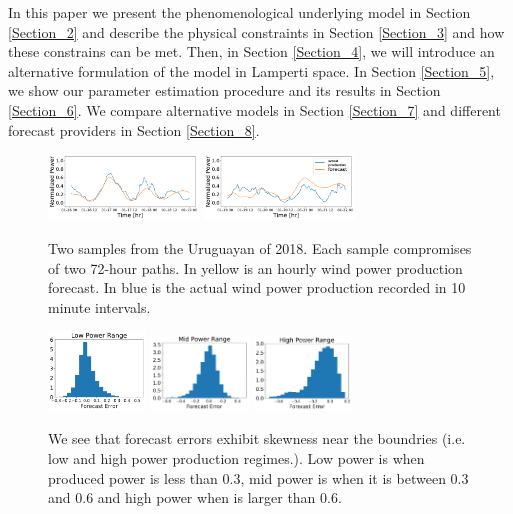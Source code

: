 \documentclass[10pt,twocolumn,letterpaper]{article}
\begin{document}
In this paper we present the phenomenological underlying model in Section \ref{Section_2} and describe the physical constraints in Section \ref{Section_3} and how these constrains can be met. Then, in Section \ref{Section_4}, we will introduce an alternative formulation of the model in Lamperti space. In Section \ref{Section_5}, we show our parameter estimation procedure and its results in Section \ref{Section_6}. We compare alternative models in Section \ref{Section_7} and different forecast providers in Section \ref{Section_8}.
\begin{figure}
  \includegraphics[width=40mm,scale=1]{plots/data_1516064400.pdf}
  \includegraphics[width=40mm,scale=1]{plots/data_1516323600.pdf}\\
  \caption{Two samples from the Uruguayan of 2018. Each sample compromises of two 72-hour paths. In yellow is an hourly wind power production forecast. In blue is the actual wind power production recorded in 10 minute intervals.}
  \label{fig:sample_data}
\end{figure}

\begin{figure}
  \includegraphics[width=26mm,scale=1]{plots/hist_low.pdf}
  \includegraphics[width=26mm,scale=1]{plots/hist_mid.pdf}
  \includegraphics[width=26mm,scale=1]{plots/hist_high.pdf}
  \caption{We see that forecast errors exhibit skewness near the boundries (i.e. low and high power production regimes.). Low power is when produced power is less than $0.3$, mid power is when it is between $0.3$ and $0.6$ and high power when is larger than $0.6$. }
  \label{fig:skew_data}
\end{figure}
\end{document}
